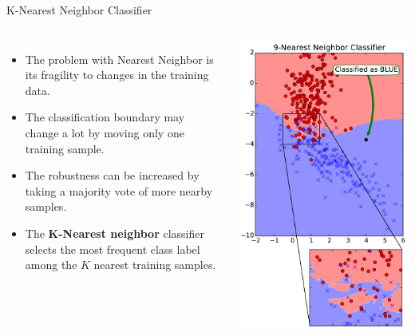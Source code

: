 \documentclass[10pt, aspectratio=169]{beamer} %
\begin{document}
\begin{frame}{K-Nearest Neighbor Classifier}
\begin{columns}
\begin{itemize}
\item The problem with Nearest Neighbor is its fragility to changes in the training data.
\item The classification boundary may change a lot by moving only one training sample.
\item The robustness can be increased by taking a majority vote of more nearby samples.
\item The  \textbf{K-Nearest neighbor} classifier selects the most frequent class label among
the $K$ nearest training samples.
\end{itemize}
\centerline{\includegraphics[width=\columnwidth]{9NN.pdf}}
\end{columns}
\end{frame}
\end{document}

